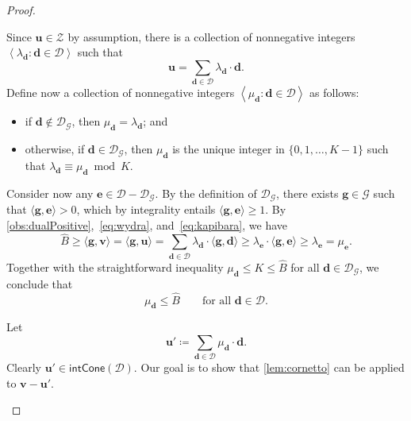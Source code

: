 \documentclass{theoretics}
\renewcommand{\leq}{\leqslant}
\renewcommand{\geq}{\geqslant}
\newcommand{\Dd}{\mathcal{D}}
\newcommand{\tup}[1]{{\mathbf{#1}}}
\renewcommand{\gg}{\tup g}
\newcommand{\dd}{\tup d}
\newcommand{\ee}{\tup e}
\newcommand{\uu}{\tup u}
\newcommand{\myvv}{\tup v} %
\newcommand{\mset}[1]{\left\langle #1\right\rangle}
\newcommand{\Gg}{\mathcal{G}}
\newcommand{\Zz}{\mathcal{Z}}
\newcommand{\sca}[2]{\langle #1,#2\rangle}
\renewcommand{\setminus}{-}
\newcommand{\intcone}{\mathsf{intCone}}
\begin{document}
\begin{proof}
\begin{subproof}
 Since $\uu\in \Zz$ by assumption, there is a collection of nonnegative integers $\mset{\lambda_\dd\colon \dd\in \Dd}$ such that
 $$\uu=\sum_{\dd\in \Dd} \lambda_\dd\cdot \dd.$$
 Define now a collection of nonnegative integers $\mset{\mu_\dd\colon \dd\in \Dd}$ as follows:
 \begin{itemize}[nosep]
  \item if $\dd\notin \Dd_\Gg$, then $\mu_\dd=\lambda_\dd$; and
  \item otherwise, if $\dd\in \Dd_\Gg$, then $\mu_\dd$ is the unique integer in $\{0,1,\ldots,K-1\}$ such that $\lambda_\dd\equiv \mu_\dd\bmod K$.
 \end{itemize}
 Consider now any $\ee\in \Dd\setminus \Dd_\Gg$. By the definition of $\Dd_\Gg$, there exists $\gg\in \Gg$ such that $\sca{\gg}{\ee}>0$, which by integrality entails $\sca{\gg}{\ee}\geq 1$. By \cref{obs:dualPositive},~\cref{eq:wydra}, and~\cref{eq:kapibara}, we have
 $$\widehat{B}\geq \sca{\gg}{\myvv}=\sca{\gg}{\uu}=\sum_{\dd\in \Dd} \lambda_\dd\cdot \sca{\gg}{\dd} \geq \lambda_{\ee}\cdot \sca{\gg}{\ee}\geq \lambda_\ee=\mu_\ee.$$
 Together with the straightforward inequality $\mu_\dd\leq K\leq \widehat{B}$ for all $\dd\in \Dd_\Gg$, we conclude that
 \begin{equation}\label{eq:nutria}
  \mu_\dd\leq \widehat{B}\qquad \textrm{for all }\dd\in \Dd.
 \end{equation}

 Let
 $$\uu'\coloneqq \sum_{\dd\in \Dd} \mu_\dd\cdot \dd.$$
 Clearly $\uu'\in \intcone(\Dd)$. Our goal is to show that \cref{lem:cornetto} can be applied to $\myvv-\uu'$.


\end{subproof}
\end{proof}
\end{document}
